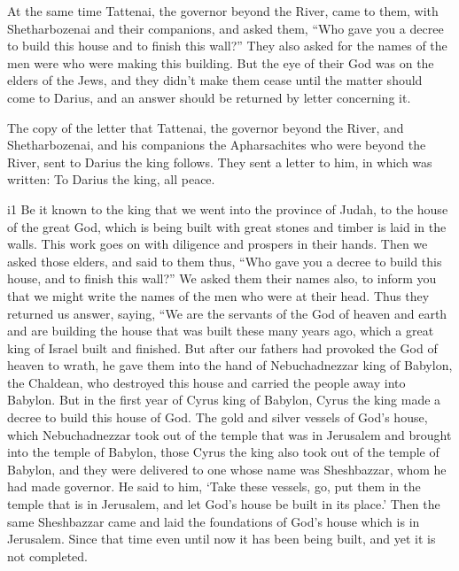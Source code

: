  At the same time Tattenai, the governor beyond the River,
came to them, with Shetharbozenai and their companions, and asked them,
``Who gave you a decree to build this house and to finish this wall?''
 They also asked for the names of the men were who were
making this building.  But the eye of their God was on the
elders of the Jews, and they didn't make them cease until the matter
should come to Darius, and an answer should be returned by letter
concerning it.

 The copy of the letter that Tattenai, the governor beyond
the River, and Shetharbozenai, and his companions the Apharsachites who
were beyond the River, sent to Darius the king follows. 
They sent a letter to him, in which was written: To Darius the king, all
peace.

i1 Be it known to the king that we went into the province
of Judah, to the house of the great God, which is being built with great
stones and timber is laid in the walls. This work goes on with diligence
and prospers in their hands.  Then we asked those elders,
and said to them thus, ``Who gave you a decree to build this house, and
to finish this wall?''  We asked them their names also,
to inform you that we might write the names of the men who were at their
head.  Thus they returned us answer, saying, ``We are the
servants of the God of heaven and earth and are building the house that
was built these many years ago, which a great king of Israel built and
finished.  But after our fathers had provoked the God of
heaven to wrath, he gave them into the hand of Nebuchadnezzar king of
Babylon, the Chaldean, who destroyed this house and carried the people
away into Babylon.  But in the first year of Cyrus king
of Babylon, Cyrus the king made a decree to build this house of God.
 The gold and silver vessels of God's house, which
Nebuchadnezzar took out of the temple that was in Jerusalem and brought
into the temple of Babylon, those Cyrus the king also took out of the
temple of Babylon, and they were delivered to one whose name was
Sheshbazzar, whom he had made governor.  He said to him,
`Take these vessels, go, put them in the temple that is in Jerusalem,
and let God's house be built in its place.'  Then the
same Sheshbazzar came and laid the foundations of God's house which is
in Jerusalem. Since that time even until now it has been being built,
and yet it is not completed.

